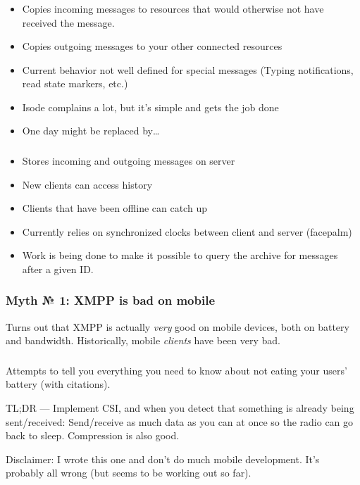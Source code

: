 \documentclass[xelatex,aspectratio=169]{beamer}
\begin{document}
\begin{frame}
	\frametitle{}
	\begin{itemize}
		\item Copies incoming messages to resources that would otherwise not have received the message.
		\item Copies outgoing messages to your other connected resources
		\item Current behavior not well defined for special messages (Typing notifications, read state markers, etc.)
		\item Isode complains a lot, but it's simple and gets the job done
		\item One day might be replaced by\ldots
	\end{itemize}
\end{frame}

\begin{frame}
	\frametitle{}
	\begin{itemize}
		\item Stores incoming and outgoing messages on server
		\item New clients can access history
		\item Clients that have been offline can catch up
		\item Currently relies on synchronized clocks between client and server (facepalm)
		\item Work is being done to make it possible to query the archive for
			messages after a given ID.
	\end{itemize}
\end{frame}

\begin{frame}
	\frametitle{Myth № 1: XMPP is bad on mobile}
	Turns out that XMPP is actually \emph{very} good on mobile devices, both on
	battery and bandwidth. Historically, mobile \emph{clients} have been very bad.
\end{frame}

\begin{frame}
	\frametitle{}
	\begin{flushleft}
		Attempts to tell you everything you need to know about not eating your users'
		battery (with citations).
	\end{flushleft}
	\begin{flushleft}
		TL;DR --- Implement CSI, and when you detect that something is already being
		sent/received: Send/receive as much data as you can at once so the radio can
		go back to sleep. Compression is also good.
	\end{flushleft}
	\begin{flushleft}
		Disclaimer: I wrote this one and don't do much mobile development. It's
		probably all wrong (but seems to be working out so far).
	\end{flushleft}
\end{frame}
\end{document}

